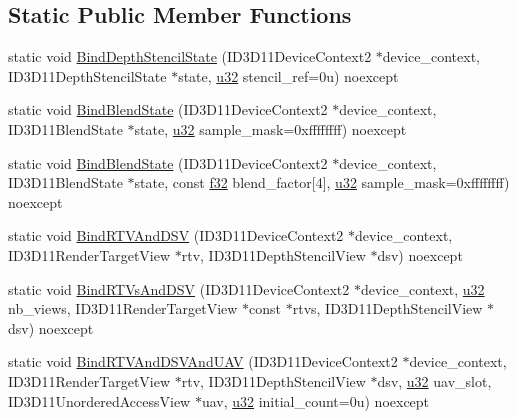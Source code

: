 \subsection*{Static Public Member Functions}
\begin{DoxyCompactItemize}
\item 
static void \hyperlink{structmage_1_1_pipeline_1_1_o_m_a3542be5ee9a464148fb1e3b91dfd3e1d}{Bind\+Depth\+Stencil\+State} (I\+D3\+D11\+Device\+Context2 $\ast$device\+\_\+context, I\+D3\+D11\+Depth\+Stencil\+State $\ast$state, \hyperlink{namespacemage_af2b398bf98eb10351f49cad73fe2cc73}{u32} stencil\+\_\+ref=0u) noexcept
\item 
static void \hyperlink{structmage_1_1_pipeline_1_1_o_m_a971961b7f45426f140f9c1c15725a346}{Bind\+Blend\+State} (I\+D3\+D11\+Device\+Context2 $\ast$device\+\_\+context, I\+D3\+D11\+Blend\+State $\ast$state, \hyperlink{namespacemage_af2b398bf98eb10351f49cad73fe2cc73}{u32} sample\+\_\+mask=0xffffffff) noexcept
\item 
static void \hyperlink{structmage_1_1_pipeline_1_1_o_m_a86f41ce41a155251a036ae0c5d7e9f59}{Bind\+Blend\+State} (I\+D3\+D11\+Device\+Context2 $\ast$device\+\_\+context, I\+D3\+D11\+Blend\+State $\ast$state, const \hyperlink{namespacemage_a6a44ad388483959dc4dff9f2aef91431}{f32} blend\+\_\+factor\mbox{[}4\mbox{]}, \hyperlink{namespacemage_af2b398bf98eb10351f49cad73fe2cc73}{u32} sample\+\_\+mask=0xffffffff) noexcept
\item 
static void \hyperlink{structmage_1_1_pipeline_1_1_o_m_a0f699cf987aaec62ab9480f6e3367c62}{Bind\+R\+T\+V\+And\+D\+SV} (I\+D3\+D11\+Device\+Context2 $\ast$device\+\_\+context, I\+D3\+D11\+Render\+Target\+View $\ast$rtv, I\+D3\+D11\+Depth\+Stencil\+View $\ast$dsv) noexcept
\item 
static void \hyperlink{structmage_1_1_pipeline_1_1_o_m_a40190e0d5b5451d9aebb8b815e2cff22}{Bind\+R\+T\+Vs\+And\+D\+SV} (I\+D3\+D11\+Device\+Context2 $\ast$device\+\_\+context, \hyperlink{namespacemage_af2b398bf98eb10351f49cad73fe2cc73}{u32} nb\+\_\+views, I\+D3\+D11\+Render\+Target\+View $\ast$const $\ast$rtvs, I\+D3\+D11\+Depth\+Stencil\+View $\ast$dsv) noexcept
\item 
static void \hyperlink{structmage_1_1_pipeline_1_1_o_m_a6b75a9f36fa5a268257fa8e2f952d3c8}{Bind\+R\+T\+V\+And\+D\+S\+V\+And\+U\+AV} (I\+D3\+D11\+Device\+Context2 $\ast$device\+\_\+context, I\+D3\+D11\+Render\+Target\+View $\ast$rtv, I\+D3\+D11\+Depth\+Stencil\+View $\ast$dsv, \hyperlink{namespacemage_af2b398bf98eb10351f49cad73fe2cc73}{u32} uav\+\_\+slot, I\+D3\+D11\+Unordered\+Access\+View $\ast$uav, \hyperlink{namespacemage_af2b398bf98eb10351f49cad73fe2cc73}{u32} initial\+\_\+count=0u) noexcept

\end{DoxyCompactItemize}
